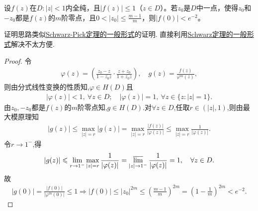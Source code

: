 \documentclass[../../main.tex]{subfiles}%
\begin{document}
\begin{example}
设$f(z)$在$D: |z|<1$内全纯，且$|f(z)|\leqslant 1$（$z\in D$）。若$z_0$是$D$中一点，使得$z_0$和$-z_0$都是$f(z)$的$m$阶零点，且$0<|z_0|\leqslant \frac{m-1}{m}$，则$|f(0)|<e^{-2}$。
\end{example}
\begin{note}
证明思路类似\hyperref[theorem:Schwarz-Pick定理的一般形式]{Schwarz-Pick定理的一般形式}的证明.
直接利用\hyperref[theorem:Schwarz定理的一般形式]{Schwarz定理的一般形式}解决不太方便.
\end{note}
\begin{proof}

令
\begin{align*}
\varphi(z)=\left(\frac{z_0-z}{1-\overline{z_0}z}\cdot\frac{z+z_0}{1+\overline{z_0}z}\right),\quad g(z)=\frac{f(z)}{\varphi^m(z)},
\end{align*}
则由分式线性变换的性质知,$\varphi\in H(D)$且
\begin{align*}
|\varphi(z)|<1,\ \forall z\in D;\quad |\varphi(z)|=1,\ \forall z\in\{z:|z|=1\}.
\end{align*}
由$z_0,-z_0$都是$f(z)$的$m$阶零点知,$g\in H(D)$.对$\forall z\in D$,任取$r\in(|z|,1)$,则由最大模原理知
\begin{align*}
|g(z)|\leqslant\max\limits_{|z|=r}|g(z)|=\max\limits_{|z|=r}\frac{|f(z)|}{|\varphi(z)|}\leqslant\max\limits_{|z|=r}\frac{1}{|\varphi(z)|}.
\end{align*}
令$r\rightarrow1^-$,得
\begin{align*}
|g(z)|\leqslant\lim\limits_{r\rightarrow1^-}\max\limits_{|z|=r}\frac{1}{|\varphi(z)|}=\varlimsup\limits_{|z|\rightarrow1^-}\frac{1}{|\varphi(z)|}=1,\quad \forall z\in D.
\end{align*}
故
\begin{align*}
\left| g\left( 0 \right) \right|=\frac{\left| f\left( 0 \right) \right|}{\left| \varphi ^m\left( 0 \right) \right|}\leqslant 1\Longrightarrow \left| f\left( 0 \right) \right|\leqslant \left| z_0 \right|^{2m}\leqslant \left( \frac{m-1}{m} \right) ^{2m}=\left( 1-\frac{1}{m} \right) ^{2m}<e^{-2}.
\end{align*}

\end{proof}
\end{document}
